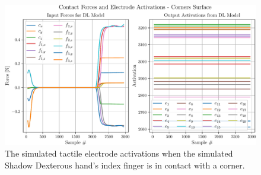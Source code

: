 \begin{figure}[!h]
	\begin{center}
		\includegraphics[width=\textwidth]{chapters/1-tactile-perception/fig/matplotlib/corners-contact-graph.pdf}
	\end{center}
	\caption{The simulated tactile electrode activations when the simulated Shadow Dexterous hand's index finger is in contact with a corner.}
	\label{app:corner-contact-graph}
\end{figure}